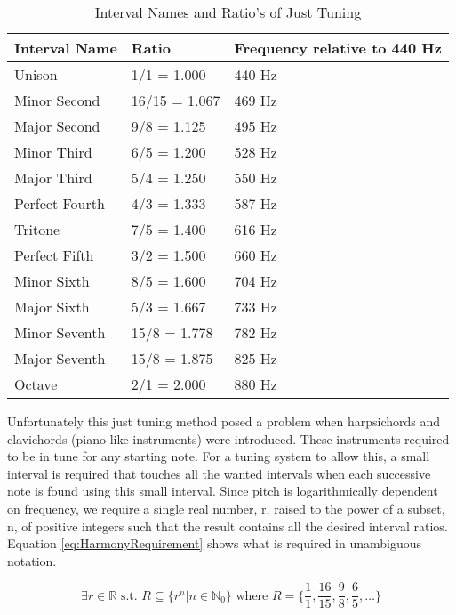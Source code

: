 \begin{table}[h]
\centering
\caption{Interval Names and Ratio's of Just Tuning}
\begin{tabu} to \textwidth { | X[l] | X[c] | X[r] | }
	\hline \bf Interval Name & \bf Ratio  & Frequency relative to 440 Hz \\
	\hline Unison & 1/1 = 1.000 & 440 Hz \\
	\hline Minor Second & 16/15 = 1.067 & 469 Hz \\
	\hline Major Second & 9/8 = 1.125 & 495 Hz \\
	\hline Minor Third & 6/5 = 1.200 & 528 Hz \\
	\hline Major Third & 5/4 = 1.250 & 550 Hz \\
	\hline Perfect Fourth & 4/3 = 1.333 & 587 Hz \\
	\hline Tritone & 7/5 = 1.400 & 616 Hz \\
	\hline Perfect Fifth & 3/2 = 1.500 & 660 Hz \\
	\hline Minor Sixth & 8/5 = 1.600 & 704 Hz \\
	\hline Major Sixth & 5/3 = 1.667 & 733 Hz \\
	\hline Minor Seventh & 15/8 = 1.778 & 782 Hz \\
	\hline Major Seventh & 15/8 = 1.875 & 825 Hz \\
	\hline Octave & 2/1 = 2.000 & 880 Hz \\
	\hline
\end{tabu}
\label{tab:JustTuning}
\end{table}

Unfortunately this just tuning method posed a problem when harpsichords and
clavichords (piano-like instruments) were introduced. These instruments required
to be in tune for any starting note. For a tuning system to allow this, a small
interval is required that touches all the wanted intervals when each successive
note is found using this small interval. Since pitch is logarithmically
dependent on frequency, we require a single real number, r, raised to the power of
a subset, n, of positive integers such that the result contains all the desired
interval ratios. Equation \ref{eq:HarmonyRequirement} shows what is required in
unambiguous notation.

\begin{equation}\label{eq:HarmonyRequirement}
	\exists r \in \mathbb{R} \text{ s.t. }
	R \subseteq \{ r^n | n \in \mathbb{N}_0 \}
	\text{ where } R = \{ \frac{1}{1}, \frac{16}{15}, \frac{9}{8}, \frac{6}{5}, \dots \}
\end{equation}

